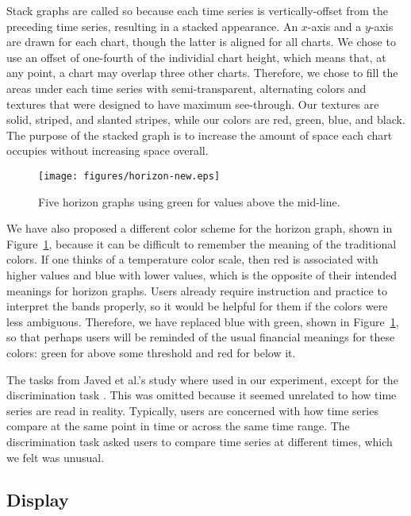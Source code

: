 \documentclass{article}
\begin{document}
Stack graphs are called so because each time series is vertically-offset from the preceding time series, resulting in a stacked appearance.  An $x$-axis and a $y$-axis are drawn for each chart, though the latter is aligned for all charts.  We chose to use an offset of one-fourth of the individial chart height, which means that, at any point, a chart may overlap three other charts.  Therefore, we chose to fill the areas under each time series with semi-transparent, alternating colors and textures that were designed to have maximum see-through.  Our textures are solid, striped, and slanted stripes, while our colors are red, green, blue, and black. The purpose of the stacked graph is to increase the amount of space each chart occupies without increasing space overall.

\begin{figure}[h]
	\centering
	\texttt{[image: figures/horizon-new.eps]}
	\caption{Five horizon graphs using green for values above the mid-line.}
	\label{fig:newHorizon}
\end{figure}

We have also proposed a different color scheme for the horizon graph, shown in Figure~\ref{fig:newHorizon}, because it can be difficult to remember the meaning of the traditional colors.  If one thinks of a temperature color scale, then red is associated with higher values and blue with lower values, which is the opposite of their intended meanings for horizon graphs.  Users already require instruction and practice to interpret the bands properly, so it would be helpful for them if the colors were less ambiguous.  Therefore, we have replaced blue with green, shown in Figure~\ref{fig:newHorizon}, so that perhaps users will be reminded of the usual financial meanings for these colors: green for above some threshold and red for below it.

The tasks from Javed et al.'s study where used in our experiment, except for the discrimination task \cite{javed2010}.  This was omitted because it seemed unrelated to how time series are read in reality.  Typically, users are concerned with how time series compare at the same point in time or across the same time range.  The discrimination task asked users to compare time series at different times, which we felt was unusual.

\subsection{Display}
\end{document}
